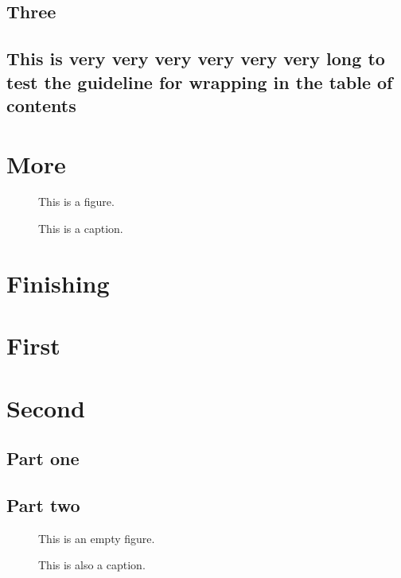 \documentclass{utthesis}
\begin{document}
\section{Three}
\section{This is very very very very very very long to test the guideline for wrapping in the table of contents}

\chapter{More}
\lipsum[3]
\begin{figure}
This is a figure.
\caption[This]{This is a caption.}
\end{figure}

\chapter{Finishing}
\lipsum[3]

\begin{appendix}

\chapter{First}
\lipsum[3]

\chapter{Second}
\section{Part one}
\lipsum[3]
\section{Part two}
\begin{figure}
This is an empty figure.
\caption[That]{This is also a caption.}
\end{figure}

\end{appendix}

\backmatter

\printindex

\cleardoublepage
{}

\printbibliography
\end{document}
